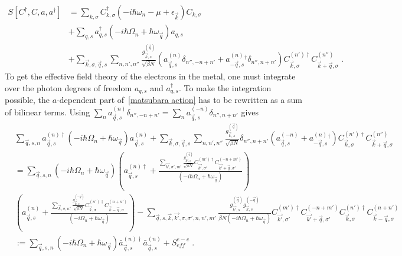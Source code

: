 \documentclass{article}
\begin{document}
\begin{align}
    S[C^{\dagger},C,a,a^{\dagger}] &= \sum_{k,\sigma} C^{\dagger}_{k,\sigma}\left(-i\hbar\omega_n - \mu + \epsilon_{\vec{k}}\right) C_{k,\sigma} \nonumber \\
                                   &+ \sum_{q,s} a^{\dagger}_{q,s} \left(-i\hbar \Omega_n + \hbar \omega_{\vec{q}}\right) a_{q,s} \label{matsubara action} \\
                                   &+ \sum_{\vec{k},\sigma,\vec{q},s} \sum_{n,n',n''} \frac{g_{\vec{k},s}^{(\vec{q})}}{\sqrt{\beta N}} \left(a^{(n)}_{\vec{q},s} \delta_{n'', -n + n'} + a^{(n)}_{-\vec{q}, s}^{\dagger}  \delta_{n'',n + n'}\right) C^{(n')\dagger}_{\vec{k},\sigma}C^{(n'')}_{\vec{k} + \vec{q},\sigma}\;.\nonumber
\end{align}
To get the effective field theory of the electrons in the metal, one must integrate over the photon degrees of freedom $a_{q,s}$ and $a_{q,s}^{\dagger}$. To make the integration possible, the $a$-dependent part of~\cref{matsubara action} has to be rewritten as a sum of bilinear terms. Using $\sum_n a^{(n)}_{\vec{q},s} \delta_{n'', -n + n'} = \sum_n a^{(-n)}_{\vec{q},s} \delta_{n'', n + n'}$ gives
\begin{align}
     &\sum_{\vec{q},s,n} a^{(n)\dagger}_{\vec{q},s} \left(-i\hbar\Omega_n + \hbar \omega_{\vec{q}}\right) a^{(n)}_{\vec{q},s} + \sum_{\vec{k},\sigma,\vec{q},s} \sum_{n,n',n''} \frac{g_{\vec{k},s}^{(\vec{q})}}{\sqrt{\beta N}} \delta_{n'',n + n'} \left(a^{(-n)}_{\vec{q},s} + a^{(n)}_{-\vec{q}, s}^{\dagger}\right) C^{(n')\dagger}_{\vec{k},\sigma}C^{(n'')}_{\vec{k} + \vec{q},\sigma}\nonumber \\
     &= \sum_{\vec{q},s,n} \left(-i\hbar\Omega_n + \hbar \omega_{\vec{q}}\right)  \left(a^{(n)\dagger}_{\vec{q},s} + \frac{\sum_{\vec{k'},\sigma', m'} \frac{g_{\vec{k'},s}^{(\vec{q})}}{\sqrt{\beta N}} C^{(m')\dagger}_{\vec{k'},\sigma'}C^{(-n + m')}_{\vec{k'} + \vec{q},\sigma'} }{\left(-i\hbar\Omega_n + \hbar \omega_{\vec{q}}\right)} \right) \label{rewriting action}\\
     & \left(a^{(n)}_{\vec{q},s} + \frac{\sum_{\vec{k},\sigma, n'} \frac{g_{\vec{k},s}^{(-\vec{q})}}{\sqrt{\beta N}} C^{(n')\dagger}_{\vec{k},\sigma}C^{(n + n')}_{\vec{k} - \vec{q},\sigma} }{\left(-i\Omega_{n} + \hbar \omega_{\vec{q}}\right)}\right)
     -\sum_{\vec{q},s,\vec{k},\vec{k'},\sigma,\sigma', n, n', m'} \frac{g_{\vec{k'},s}^{(\vec{q})} g_{\vec{k},s}^{(-\vec{q})}  }{\beta N\left(-i\hbar\Omega_n + \hbar \omega_{\vec{q}}\right)}
      C^{(m')\dagger}_{\vec{k'},\sigma'}C^{(-n + m')}_{\vec{k'} + \vec{q},\sigma'} C^{(n')\dagger}_{\vec{k},\sigma}C^{(n + n')}_{\vec{k} - \vec{q},\sigma}\nonumber \\
     &:= \sum_{\vec{q},s,n} \left(-i\hbar\Omega_n + \hbar \omega_{\vec{q}}\right)  \bar{a}^{(n)\dagger}_{\vec{q},s}\bar{a}^{(n)}_{\vec{q},s} + S^{e-e}_{eff}\;.\nonumber \\
\end{align}
\end{document}
